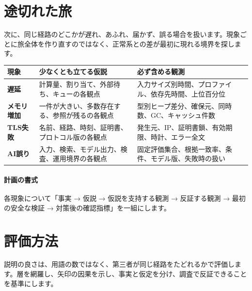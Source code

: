 \par
\endgroup


\section{途切れた旅}
\label{sec:07-practice-17}

次に、同じ経路のどこかが遅れ、あふれ、届かず、誤る場合を扱います。現象ごとに旅全体を作り直すのではなく、正常系との差が最初に現れる境界を探します。

\begingroup
  \noindent
  \begin{tabularx}{\textwidth}{@{}>{\bfseries}p{22mm}YY@{}}
    \toprule
    現象 & 少なくとも立てる仮説 & 必ず含める観測 \\
    \midrule
    遅延 & 計算量、割り当て、外部待ち、キューの各観点 & 入力サイズ別時間、プロファイル、依存先時間、上位百分位 \\
    メモリ増加 & 一件が大きい、多数存在する、参照が残るの各観点 & 型別ヒープ差分、確保元、同時数、GC、キャッシュ件数 \\
    TLS失敗 & 名前、経路、時刻、証明書、プロトコル版の各観点 & 発生元、IP、証明書鎖、有効期限、時計、エラー全文 \\
    AI誤り & 入力、検索、モデル出力、検査、運用境界の各観点 & 固定評価集合、根拠一致率、条件、モデル版、失敗時の扱い \\
    \bottomrule
  \end{tabularx}
  \vspace{4mm}
\paragraph{計画の書式}
    各現象について「事実 → 仮説 → 仮説を支持する観測 → 反証する観測 → 最初の安全な検証 → 対策後の確認指標」を一組にします。

\par
\endgroup


\section{評価方法}
\label{sec:07-practice-18}

説明の良さは、用語の数ではなく、第三者が同じ経路をたどれるかで評価します。層を網羅し、矢印の因果を示し、事実と仮定を分け、調査で反証できることを基準にします。

